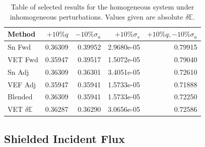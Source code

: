 \documentclass[12pt]{report}
\newcommand{\Edd}{\mathbb{E}}
\newcommand{\sigs}{\sigma_s}
\newcommand{\siga}{\sigma_a}
\begin{document}
\begin{table}[H]
\centering
  \begin{tabular}{| l | r | r | r | r |}
    \hline
    Method  &  $+10\% q $  & $-10\% \siga $ & $+10\% \sigs $ & $+10\% q,-10\% \siga$ \\ \hline
     Sn Fwd 			&0.36309 &0.39952 &2.9680e-05 & 0.79915\\ \hline
     VET Fwd			&0.35947 &0.39517 &1.5072e-05 &0.79040\\ \hline
     Sn Adj  			&0.36309 &0.36301 &3.4051e-05 &0.72610\\ \hline
     VEF Adj 			&0.35947 &0.35941 &1.5733e-05 &0.71888\\ \hline
     Blended 			&0.36309 &0.35941 &1.5733e-05 &0.72250\\ \hline
     VET $\delta \Edd$ 	&0.36287 &0.36290 &3.0656e-05 &0.72586\\ \hline
    \end{tabular}
  \caption{Table of selected results for the homogeneous system under inhomogeneous perturbations. Values given are absolute $\delta \Edd$. }
\end{table}

\subsection{Shielded Incident Flux}
\end{document}
